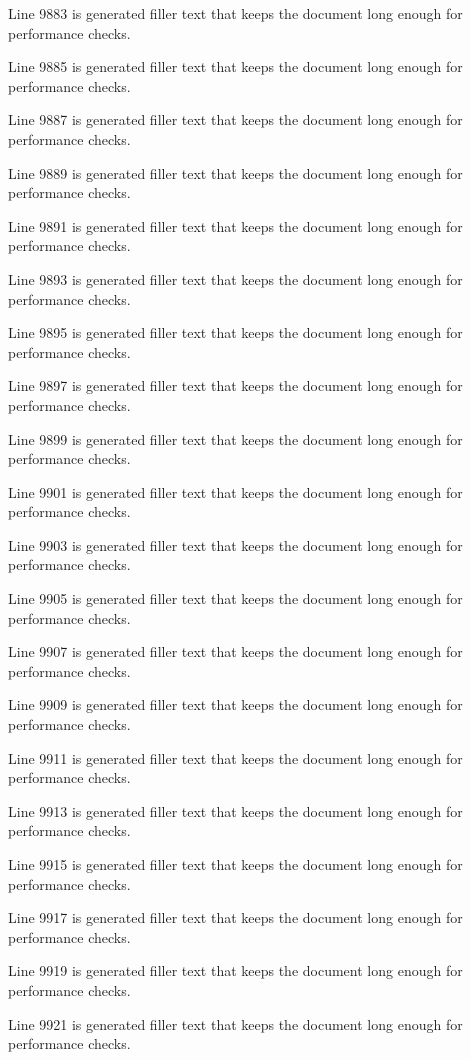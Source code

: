 Line 9883 is generated filler text that keeps the document long enough for performance checks.

Line 9885 is generated filler text that keeps the document long enough for performance checks.

Line 9887 is generated filler text that keeps the document long enough for performance checks.

Line 9889 is generated filler text that keeps the document long enough for performance checks.

Line 9891 is generated filler text that keeps the document long enough for performance checks.

Line 9893 is generated filler text that keeps the document long enough for performance checks.

Line 9895 is generated filler text that keeps the document long enough for performance checks.

Line 9897 is generated filler text that keeps the document long enough for performance checks.

Line 9899 is generated filler text that keeps the document long enough for performance checks.

Line 9901 is generated filler text that keeps the document long enough for performance checks.

Line 9903 is generated filler text that keeps the document long enough for performance checks.

Line 9905 is generated filler text that keeps the document long enough for performance checks.

Line 9907 is generated filler text that keeps the document long enough for performance checks.

Line 9909 is generated filler text that keeps the document long enough for performance checks.

Line 9911 is generated filler text that keeps the document long enough for performance checks.

Line 9913 is generated filler text that keeps the document long enough for performance checks.

Line 9915 is generated filler text that keeps the document long enough for performance checks.

Line 9917 is generated filler text that keeps the document long enough for performance checks.

Line 9919 is generated filler text that keeps the document long enough for performance checks.

Line 9921 is generated filler text that keeps the document long enough for performance checks.


